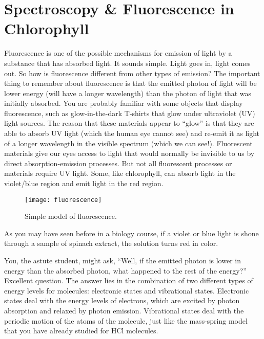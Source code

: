 \chapter{Spectroscopy \& Fluorescence in Chlorophyll}
\thispagestyle{fancy}
Fluorescence is one of the possible mechanisms for emission of light by a substance that has absorbed light. 
It sounds simple. 
Light goes in, light comes out. 
So how is fluorescence different from other types of emission? 
The important thing to remember about fluorescence is that the emitted photon of light will be lower energy (will have a longer wavelength) than the photon of light that was initially absorbed. 
You are probably familiar with some objects that display fluorescence, such as glow-in-the-dark T-shirts that glow under ultraviolet (UV) light sources. 
The reason that these materials appear to “glow” is that they are able to absorb UV light (which the human eye cannot see) and re-emit it as light of a longer wavelength in the visible spectrum (which we can see!). 
Fluorescent materials give our eyes access to light that would normally be invisible to us by direct absorption-emission processes. 
But not all fluorescent processes or materials require UV light. 
Some, like chlorophyll, can absorb light in the violet/blue region and emit light in the red region. 
%
\begin{wrapfigure}{r}{0.44\textwidth}
  \vspace{-15pt}  
  \begin{center}
    \texttt{[image: fluorescence]}
  \end{center}
  \vspace{-20pt}
  \caption{Simple model of fluorescence.}
  \label{fig:fluorescence}
  \vspace{-5pt}
\end{wrapfigure}
%
As you may have seen before in a biology course, if a violet or blue light is shone through a sample of spinach extract, the solution turns red in color.
\par 
You, the astute student, might ask, “Well, if the emitted photon is lower in energy than the absorbed photon, what happened to the rest of the energy?” 
Excellent question. 
The answer lies in the combination of two different types of energy levels for molecules: electronic states and vibrational states. 
Electronic states deal with the energy levels of electrons, which are excited by photon absorption and relaxed by photon emission. 
Vibrational states deal with the periodic motion of the atoms of the molecule, just like the mass-spring model that you have already studied for HCl molecules. 
